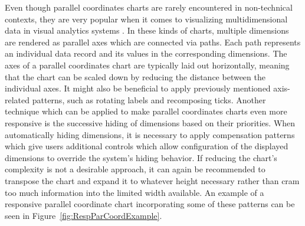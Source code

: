 Even though parallel coordinates charts are rarely encountered in
non-technical contexts, they are very popular when it comes to
visualizing multidimensional data in visual analytics systems
\parencite{HighD}.  In these kinds of charts, multiple dimensions are
rendered as parallel axes which are connected via paths.  Each path
represents an individual data record and its values in the
corresponding dimensions.  The axes of a parallel coordinates chart
are typically laid out horizontally, meaning that the chart can be
scaled down by reducing the distance between the individual axes.  It
might also be beneficial to apply previously mentioned axis-related
patterns, such as rotating labels and recomposing ticks.  Another
technique which can be applied to make parallel coordinates charts
even more responsive is the successive hiding of dimensions based on
their priorities.  When automatically hiding dimensions, it is
necessary to apply compensation patterns which give users additional
controls which allow configuration of the displayed dimensions to
override the system's hiding behavior.  If reducing the chart's
complexity is not a desirable approach, it can again be recommended to
transpose the chart and expand it to whatever height necessary rather
than cram too much information into the limited width available.  An
example of a responsive parallel coordinate chart incorporating some
of these patterns can be seen in Figure~\ref{fig:RespParCoordExample}.


